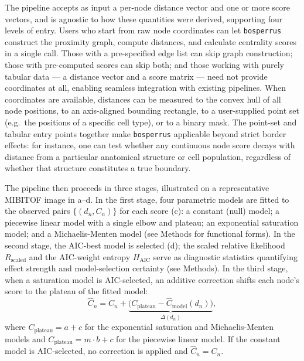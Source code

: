 \documentclass[fleqn,10pt]{olplainarticle}
\begin{document}
The pipeline accepts as input a per-node distance vector and one or more score vectors, and is agnostic to how these quantities were derived, supporting four levels of entry.
Users who start from raw node coordinates can let \texttt{bosperrus} construct the proximity graph, compute distances, and calculate centrality scores in a single call.
Those with a pre-specified edge list can skip graph construction; those with pre-computed scores can skip both; and those working with purely tabular data --- a distance vector and a score matrix --- need not provide coordinates at all, enabling seamless integration with existing pipelines.
When coordinates are available, distances can be measured to the convex hull of all node positions, to an axis-aligned bounding rectangle, to a user-supplied point set (e.g.\ the positions of a specific cell type), or to a binary mask.
The point-set and tabular entry points together make \texttt{bosperrus} applicable beyond strict border effects: for instance, one can test whether any continuous node score decays with distance from a particular anatomical structure or cell population, regardless of whether that structure constitutes a true boundary.

The pipeline then proceeds in three stages, illustrated on a representative MIBITOF image in a--d.
In the first stage, four parametric models are fitted to the observed pairs $\{(d_n, C_n)\}$ for each score (c): a constant (null) model; a piecewise linear model with a single elbow and plateau; an exponential saturation model; and a Michaelis-Menten model (see Methods for functional forms).
In the second stage, the AIC-best model is selected (d); the scaled relative likelihood $R_{\mathrm{scaled}}$ and the AIC-weight entropy $H_{\mathrm{AIC}}$ serve as diagnostic statistics quantifying effect strength and model-selection certainty (see Methods).
In the third stage, when a saturation model is AIC-selected, an additive correction shifts each node's score to the plateau of the fitted model:
\begin{equation}
    \hat{C}_n = C_n + \underbrace{\bigl(C_{\text{plateau}} - \hat{C}_{\text{model}}(d_n)\bigr)}_{\Delta(d_n)},
    \label{eq:correction}
\end{equation}
where $C_{\text{plateau}} = a + c$ for the exponential saturation and Michaelis-Menten models and $C_{\text{plateau}} = m \cdot b + c$ for the piecewise linear model.
If the constant model is AIC-selected, no correction is applied and $\hat{C}_n = C_n$.
\end{document}
